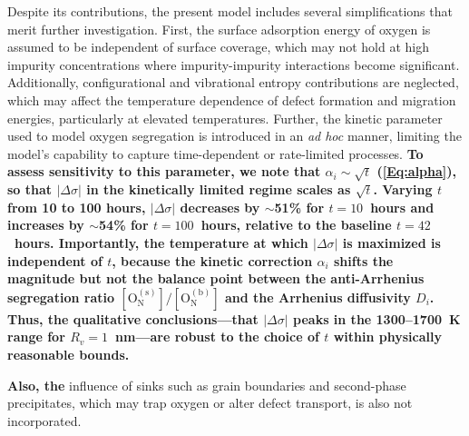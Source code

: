 \documentclass[preprint,12pt,sort&compress]{elsarticle}
\newcommand{\?}{\stackrel{?}{=}}
\providecommand{\DIFaddtex}[1]{{\bf #1}} %
\providecommand{\DIFdeltex}[1]{} %
\providecommand{\DIFaddbegin}{\protect\color{blue}} %
\providecommand{\DIFaddend}{\protect\color{black}} %
\providecommand{\DIFdelbegin}{\protect\color{red}} %
\providecommand{\DIFdelend}{\protect\color{black}} %
\providecommand{\DIFadd}[1]{\texorpdfstring{\DIFaddtex{#1}}{#1}} %
\providecommand{\DIFdel}[1]{\texorpdfstring{\DIFdeltex{#1}}{}} %
\newcommand{\DIFscaledelfig}{0.5}
\newlength{\DIFdelgraphicswidth} %
\newlength{\DIFdelgraphicsheight} %
\newcommand{\DIFaddincludegraphics}[2][]{{\color{blue}\fbox{\DIFOincludegraphics[#1]{#2}}}} %
\newcommand{\DIFdelincludegraphics}[2][]{%
\sbox{\DIFdelgraphicsbox}{\DIFOincludegraphics[#1]{#2}}%
\settoboxwidth{\DIFdelgraphicswidth}{\DIFdelgraphicsbox} %
\settoboxtotalheight{\DIFdelgraphicsheight}{\DIFdelgraphicsbox} %
\scalebox{\DIFscaledelfig}{%
\parbox[b]{\DIFdelgraphicswidth}{\usebox{\DIFdelgraphicsbox}\\[-\baselineskip] \rule{\DIFdelgraphicswidth}{0em}}\llap{\resizebox{\DIFdelgraphicswidth}{\DIFdelgraphicsheight}{%
\setlength{\unitlength}{\DIFdelgraphicswidth}%
\begin{picture}(1,1)%
\thicklines\linethickness{2pt} %
{\color[rgb]{1,0,0}\put(0,0){\framebox(1,1){}}}%
{\color[rgb]{1,0,0}\put(0,0){\line( 1,1){1}}}%
{\color[rgb]{1,0,0}\put(0,1){\line(1,-1){1}}}%
\end{picture}%
}\hspace*{3pt}}} %
} %
\DeclareRobustCommand{\DIFaddbegin}{\DIFOaddbegin \let\includegraphics\DIFaddincludegraphics} %
\DeclareRobustCommand{\DIFaddend}{\DIFOaddend \let\includegraphics\DIFOincludegraphics} %
\DeclareRobustCommand{\DIFdelbegin}{\DIFOdelbegin \let\includegraphics\DIFdelincludegraphics} %
\DeclareRobustCommand{\DIFdelend}{\DIFOaddend \let\includegraphics\DIFOincludegraphics} %
\begin{document}
Despite its contributions, the present model includes several simplifications that merit further investigation. First, the surface adsorption energy of oxygen is assumed to be independent of surface coverage, which may not hold at high impurity concentrations where impurity-impurity interactions become significant. Additionally, configurational and vibrational entropy contributions are neglected, which may affect the temperature dependence of defect formation and migration energies, particularly at elevated temperatures. Further, the kinetic parameter used to model oxygen segregation is introduced in an \textit{ad hoc} manner, limiting the model's capability to capture time-dependent or rate-limited processes. \DIFdelbegin \DIFdel{Finally, the }\DIFdelend \DIFaddbegin \DIFadd{To assess sensitivity to this parameter, we note that $\alpha_i \sim \sqrt{t}$ (\cref{Eq:alpha}), so that $|\Delta \sigma|$ in the kinetically limited regime scales as $\sqrt{t}$. Varying $t$ from 10 to 100 hours, $|\Delta \sigma|$ decreases by $\sim$51\% for $t = 10$~hours and increases by $\sim$54\% for $t = 100$~hours, relative to the baseline $t = 42$~hours. Importantly, the temperature at which $|\Delta \sigma|$ is maximized is independent of $t$, because the kinetic correction $\alpha_i$ shifts the magnitude but not the balance point between the anti-Arrhenius segregation ratio $[\text{O}_\text{N}^{(\text{s})}]/[\text{O}_\text{N}^{(\text{b})}]$ and the Arrhenius diffusivity $D_i$. Thus, the qualitative conclusions---that $|\Delta \sigma|$ peaks in the 1300--1700~K range for $R_v = 1$~nm---are robust to the choice of $t$ within physically reasonable bounds.
}

\DIFadd{Also, the }\DIFaddend influence of sinks such as grain boundaries and second-phase precipitates, which may trap oxygen or alter defect transport, is also not incorporated.
\end{document}
